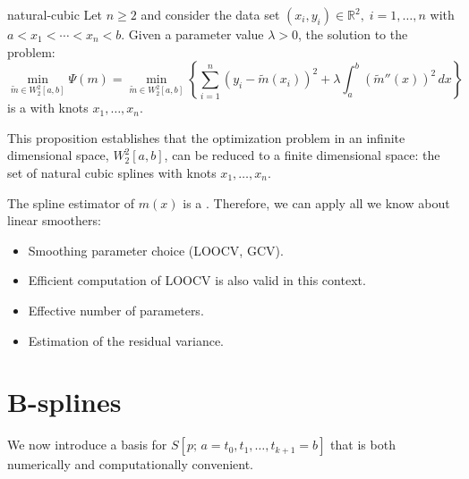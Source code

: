 \begin{prop}{}{natural-cubic}
    Let $n \geq 2$ and consider the data set $(x_i,y_i)\in\mathds R^2,\;i=1,\ldots,n$
    with $a < x_1 < \cdots < x_n < b$. Given a parameter value $\lambda > 0$,
    the solution to the problem:
    \begin{equation*}
        \min_{\tilde m \in W_2^2[a,b]} \Psi(m) = \min_{\tilde m \in W_2^2[a,b]}
        \left\{
            \sum_{i=1}^n \left( y_i - \tilde m(x_i)\right)^2
            + \lambda \int_a^b \left(\tilde m''(x)\right)^2\,dx
            \right\}
    \end{equation*}
    is a  with knots $x_1,\ldots,x_n$.
    \tcblower
    \begin{note}
        This proposition establishes that the optimization problem in an infinite
        dimensional space, $W_2^2[a,b]$, can be reduced to a finite dimensional
        space: the set of natural cubic splines with knots $x_1,\ldots,x_n$.
    \end{note}
\end{prop}

The spline estimator of $m(x)$ is a . Therefore,
we can apply all we know about linear smoothers:
\begin{itemize}
    \item Smoothing parameter choice (LOOCV, GCV).
    \item Efficient computation of LOOCV is also valid in this context.
    \item Effective number of parameters.
    \item Estimation of the residual variance.
\end{itemize}

\pagebreak
\section{B-splines}

We now introduce a basis for $S[p;\,a=t_0,t_1,\ldots,t_{k+1}=b]$ that is
both numerically and computationally convenient.

